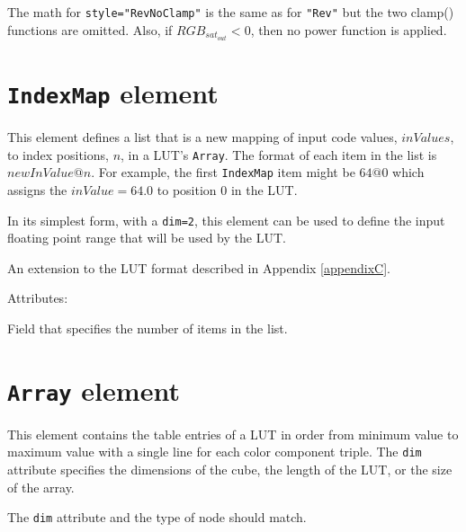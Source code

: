 The math for \texttt{style="RevNoClamp"} is the same as for \texttt{"Rev"} but the two clamp() functions are omitted. Also, if $RGB_{sat_{out}} < 0$, then no power function is applied.



\section{\texttt{IndexMap} element} \label{sec:indexmap}
This element defines a list that is a new mapping of input code values, $inValues$, to index positions, $n$, in a LUT's \texttt{Array}. The format of each item in the list is $newInValue\mathrm{@}n$. For example, the first \texttt{IndexMap} item might be $64\mathrm{@}0$ which assigns the $inValue=64.0$ to position $0$ in the LUT. 

In its simplest form, with a \texttt{dim=2}, this element can be used to define the input floating point range that will be used by the LUT.

An extension to the LUT format described in Appendix \ref{appendixC}.

Attributes:
\begin{xmlfields}
	\xmlitem[dim][required] Field that specifies the number of items in the list.	
\end{xmlfields}

\section{\texttt{Array} element}
This element contains the table entries of a LUT in order from minimum value to maximum value with a single line for each color component triple.  The \texttt{dim} attribute specifies the dimensions of the cube, the length of the LUT, or the size of the array.

The \texttt{dim} attribute and the type of node should match.

